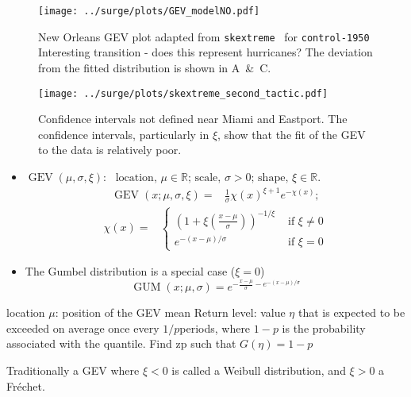 \begin{figure*}[htb!]
    \centering
    \texttt{[image: ../surge/plots/GEV\_modelNO.pdf]}
   \caption{New Orleans GEV plot adapted from \texttt{skextreme}~\cite{skextremes} for \texttt{control-1950} Interesting transition
            - does this represent hurricanes? The deviation from the fitted distribution
            is shown in A~\&~C.}
    \label{fig:gev-no}
    \texttt{[image: ../surge/plots/skextreme\_second\_tactic.pdf]}
    \vspace{-15pt}
   \caption{Confidence intervals not defined near Miami and Eastport.
   The confidence intervals, particularly in $\xi$, show that the fit of the
   GEV to the data is relatively poor.}
    \label{fig:gev_all_points}
\end{figure*}


\begin{itemize}
\item
\(
\operatorname{GEV}(\mu, \sigma, \xi):
\)
\(
\text{ location, } \mu \in \mathbb{R}
\text{; scale, } \sigma>0
\text{; shape, } \xi \in \mathbb{R}.
\)
\begin{eqnarray}
\operatorname{GEV}(x; \mu, \sigma, \xi)=&
\frac{1}{\sigma} \chi(x)^{\xi+1} e^{-\chi(x)};
\end{eqnarray}
\begin{eqnarray}
\chi(x)=&\left\{\begin{array}{ll}
\left(1+\xi\left(\frac{x-\mu}{\sigma}\right)\right)^{-1 / \xi} & \text { if } \xi \neq 0 \\
e^{-(x-\mu) / \sigma} & \text { if } \xi=0
\end{array}\right.
\end{eqnarray}
\item The Gumbel distribution is a special case ($\xi=0$)
\begin{equation}
\operatorname{GUM}(x ; \mu, \sigma)=e^{-\frac{x-\mu}{\sigma}-e^{-(x-\mu) / \sigma}}
\end{equation}
\end{itemize}

location $\mu$: position of the GEV mean
Return level: value $\eta$ that is expected to
be exceeded on average once every $1/p $periods, where $1 − p$ is the probability associated with the quantile. Find zp such that
$G(\eta) = 1 − p$


Traditionally a GEV where
$\xi<0$ is called a Weibull
distribution, and  $\xi>0$ a Fr\'echet.
